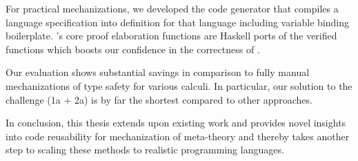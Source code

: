 For practical mechanizations, we developed the \Needle code generator that
compiles a \Knot language specification into \Coq definition for that language
including variable binding boilerplate. \Needle's core proof elaboration
functions are Haskell ports of the verified \Loom functions which boosts our
confidence in the correctness of \Needle.

Our evaluation shows substantial savings in comparison to fully manual \Coq
mechanizations of type safety for various calculi. In particular, our solution
to the \POPLmark challenge (1a + 2a) is by far the shortest compared to other
approaches.

In conclusion, this thesis extends upon existing work and provides novel
insights into code reusability for mechanization of meta-theory and thereby
takes another step to scaling these methods to realistic programming languages.
